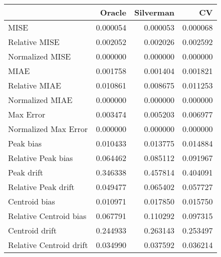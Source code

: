 \begin{tabular}{lrrr}
  \hline
 & Oracle & Silverman & CV \\ 
  \hline
MISE & 0.000054 & 0.000053 & 0.000068 \\ 
  Relative MISE & 0.002052 & 0.002026 & 0.002592 \\ 
  Normalized MISE & 0.000000 & 0.000000 & 0.000000 \\ 
  MIAE & 0.001758 & 0.001404 & 0.001821 \\ 
  Relative MIAE & 0.010861 & 0.008675 & 0.011253 \\ 
  Normalized MIAE & 0.000000 & 0.000000 & 0.000000 \\ 
  Max Error & 0.003474 & 0.005203 & 0.006977 \\ 
  Normalized Max Error & 0.000000 & 0.000000 & 0.000000 \\ 
  Peak bias & 0.010433 & 0.013775 & 0.014884 \\ 
  Relative Peak bias & 0.064462 & 0.085112 & 0.091967 \\ 
  Peak drift & 0.346338 & 0.457814 & 0.404091 \\ 
  Relative Peak drift & 0.049477 & 0.065402 & 0.057727 \\ 
  Centroid bias & 0.010971 & 0.017850 & 0.015750 \\ 
  Relative Centroid bias & 0.067791 & 0.110292 & 0.097315 \\ 
  Centroid drift & 0.244933 & 0.263143 & 0.253497 \\ 
  Relative Centroid drift & 0.034990 & 0.037592 & 0.036214 \\ 
   \hline
\end{tabular}
